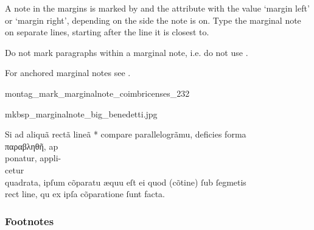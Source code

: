 \begin{mainrule}
A note in the  margins is marked by  and the attribute  with the value `margin left' or `margin right', depending on the side the note is on. Type the marginal note on separate lines, starting after the line it is closest to.
\end{mainrule}

\begin{clarification}
Do not mark paragraphs within a marginal note, i.e. do not use .
\end{clarification}

\begin{crossref}
For anchored marginal notes see .
\end{crossref}

\vspace{2mm}
\begin{sampleImage}{montag_mark_marginalnote_coimbricenses_232}

\notTranscribed

\vspace{2mm}
\end{sampleImage}

\begin{sampleImage}{mkbsp_marginalnote_big_benedetti.jpg}

\begin{typeLatin}
Si ad aliquã rectã lineã * compare parallelogrãm\bs\tld{}u, defici\bs\tld{}es forma \\
παραβληθῆ, ap  \\
ponatur, appli-  \\
cetur \\
quadrata, ipſum cõparat\bs\tld{}u æqu\bs\tld{}u eſt ei quod (cõtine) ſub ſegm\bs\tld{}etis \\
rect line, qu ex ipſa cõparatione ſunt facta.
\end{typeLatin}
\end{sampleImage}


\subsubsection{Footnotes}
\label{section footnotes}

